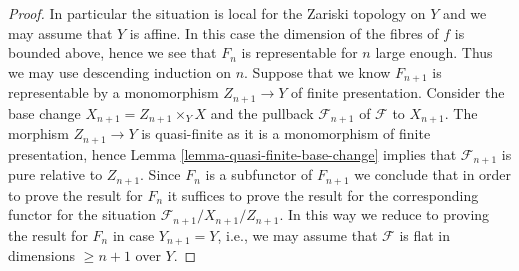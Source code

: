 \documentclass{stacks-project}
\theoremstyle{plain}
\theoremstyle{definition}
\theoremstyle{remark}
\numberwithin{equation}{subsection}
\begin{document}
\begin{proof}
\medskip\noindent
In particular the situation is local for the Zariski topology on $Y$
and we may assume that $Y$ is affine. In this case the dimension of the
fibres of $f$ is bounded above, hence we see that $F_n$ is representable
for $n$ large enough. Thus we may use descending induction on $n$.
Suppose that we know $F_{n + 1}$ is representable by a monomorphism
$Z_{n + 1} \to Y$ of finite presentation. Consider the base change
$X_{n + 1} = Z_{n + 1} \times_Y X$ and the pullback $\mathcal{F}_{n + 1}$
of $\mathcal{F}$ to $X_{n + 1}$. The morphism $Z_{n + 1} \to Y$ is
quasi-finite as it is a monomorphism of finite presentation, hence
Lemma \ref{lemma-quasi-finite-base-change}
implies that $\mathcal{F}_{n + 1}$ is pure relative to $Z_{n + 1}$.
Since $F_n$ is a subfunctor of $F_{n + 1}$ we conclude that in order
to prove the result for $F_n$ it suffices to prove the result for the
corresponding functor for the situation
$\mathcal{F}_{n + 1}/X_{n + 1}/Z_{n + 1}$.
In this way we reduce to proving the result for $F_n$ in case
$Y_{n + 1} = Y$, i.e., we may assume that $\mathcal{F}$ is flat
in dimensions $\geq n + 1$ over $Y$.


\end{proof}
\end{document}
